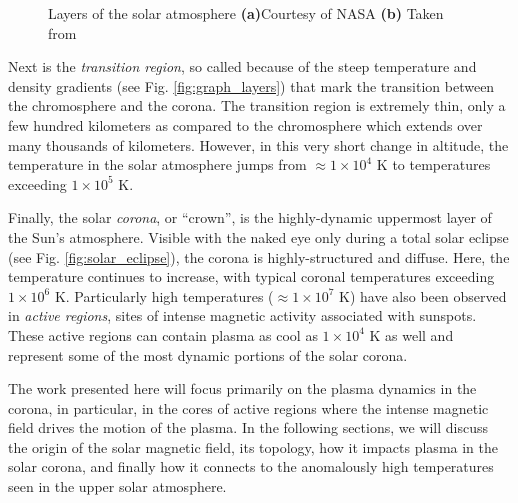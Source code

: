 \begin{figure}
	\centering
	\caption{Layers of the solar atmosphere \textbf{(a)}Courtesy of NASA \textbf{(b)} Taken from \citet{gary_solar_2007}}
	\label{fig:layers}
\end{figure} 
%
\par Next is the \textit{transition region}, so called because of the steep temperature and density gradients (see Fig. \ref{fig:graph_layers}) that mark the transition between the chromosphere and the corona. The transition region is extremely thin, only a few hundred kilometers as compared to the chromosphere which extends over many thousands of kilometers. However, in this very short change in altitude, the temperature in the solar atmosphere jumps from $\approx1\times10^4$ K to temperatures exceeding $1\times10^5$ K. 
%
\par Finally, the solar \textit{corona}, or ``crown'', is the highly-dynamic uppermost layer of the Sun's atmosphere. Visible with the naked eye only during a total solar eclipse (see Fig. \ref{fig:solar_eclipse}), the corona is highly-structured and diffuse. Here, the temperature continues to increase, with typical coronal temperatures exceeding $1\times10^6$ K. Particularly high temperatures ($\approx1\times10^7$ K) have also been observed in \textit{active regions}, sites of intense magnetic activity associated with sunspots. These active regions can contain plasma as cool as $1\times10^4$ K as well and represent some of the most dynamic portions of the solar corona.
%
\par The work presented here will focus primarily on the plasma dynamics in the corona, in particular, in the cores of active regions where the intense magnetic field drives the motion of the plasma. In the following sections, we will discuss the origin of the solar magnetic field, its topology, how it impacts plasma in the solar corona, and finally how it connects to the anomalously high temperatures seen in the upper solar atmosphere.
